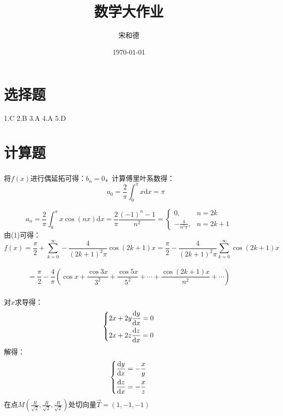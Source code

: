 \documentclass[UTF8]{ctexart}
\title{数学大作业}
\author{宋和德}
\date{\today}
\begin{document}
\maketitle

\part{选择题}
1.C 2.B 3.A 4.A 5.D
\part{计算题}
\section{}
将$f(x)$进行偶延拓可得：$b_n=0$，计算傅里叶系数得：
\[\qquad a_0=\frac{2}{\pi}\int_0^\pi x \mathrm{d} x=\pi\]

\begin{equation}
    a_n=\frac{2}{\pi}\int_0^\pi x\cos(nx) \mathrm{d} x=\frac{2}{\pi}\frac{(-1)^n-1}{n^2}=\begin{cases}
        0,                 & n=2k   \\
        -\frac{4}{n^2\pi}, & n=2k+1
    \end{cases}
\end{equation}
由(1)可得：
\[f(x)=\frac{\pi}{2}+\sum_{k=0}^\infty-\frac{4}{(2k+1)^2\pi}\cos(2k+1)x
    =\frac{\pi}{2}-\frac{4}{(2k+1)^2\pi}\sum_{k=0}^\infty\cos(2k+1)x\]\\
\[=\frac{\pi}{2}-\frac{4}{\pi}(\cos x+\frac{\cos3x}{3^2}+\frac{\cos5x}{5^2}+\cdots+\frac{\cos(2k+1)x}{n^2}+\cdots)\]
\section{}
对$x$求导得：\\
\[\left\{\begin{lgathered}
        2x+2y\frac{\mathrm{d}y}{\mathrm{d}x}=0\\
        2x+2z\frac{\mathrm{d}z}{\mathrm{d}x}=0\\
    \end{lgathered}\right.\]
解得：
\[\left\{\begin{lgathered}
        \frac{\mathrm{d}y}{\mathrm{d}x}=-\frac{x}{y}\\
        \frac{\mathrm{d}z}{\mathrm{d}x}=-\frac{x}{z}\\
    \end{lgathered}\right.\]
在点$M (\frac{R}{\sqrt{2}},\frac{R}{\sqrt{2}},\frac{R}{\sqrt{2}})$处切向量$\vec{T} =(1,-1,-1)$\\
\end{document}
